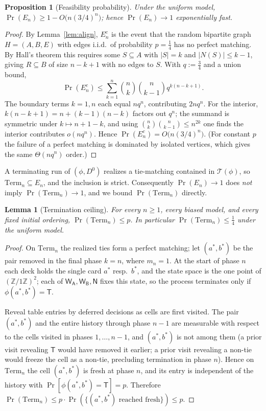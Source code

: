 \documentclass[11pt]{article}
\newtheorem{lemma}{Lemma}
\newtheorem{proposition}{Proposition}
\theoremstyle{definition}
\theoremstyle{remark}
\newcommand{\WA}{\mathsf{W_A}}
\newcommand{\WB}{\mathsf{W_B}}
\newcommand{\TT}{\mathsf{T}}
\newcommand{\NN}{\mathsf{N}}
\newcommand{\Term}{\mathrm{Term}}
\newcommand{\Z}{\mathbb{Z}}
\newcommand{\Tphi}{\mathcal{T}}
\begin{document}
\begin{proposition}[Feasibility probability]\label{prop:feas}
Under the uniform model, $\Pr(E_n) \ge 1 - O\!\bigl(n(3/4)^n\bigr)$; hence $\Pr(E_n) \to 1$ exponentially fast.
\end{proposition}
\begin{proof}
By Lemma~\ref{lem:align}, $E_n^c$ is the event that the random bipartite graph $H = (A, B, E)$ with edges i.i.d.\ of
probability $p = \tfrac14$ has no perfect matching. By Hall's theorem this requires some $S \subseteq A$ with
$|S| = k$ and $|N(S)| \le k - 1$, giving $R \subseteq B$ of size $n - k + 1$ with no edges to $S$. With $q := \tfrac34$
and a union bound,
\[
\Pr(E_n^c) \le \sum_{k=1}^n \binom{n}{k}\binom{n}{k - 1} q^{k(n-k+1)}.
\]
The boundary terms $k = 1, n$ each equal $n q^n$, contributing $2 n q^n$. For the interior, $k(n - k + 1) = n + (k-1)(n-k)$
factors out $q^n$; the summand is symmetric under $k \mapsto n + 1 - k$, and using $\binom{n}{k}\binom{n}{k-1} \le n^{2k}$
one finds the interior contributes $o(n q^n)$. Hence $\Pr(E_n^c) = O\!\bigl(n(3/4)^n\bigr)$. (For constant $p$ the failure
of a perfect matching is dominated by isolated vertices, which gives the same $\Theta(n q^n)$ order.)
\end{proof}

A terminating run of $(\phi, D^0)$ realizes a tie-matching contained in $\Tphi(\phi)$, so $\Term_n \subseteq E_n$, and the
inclusion is strict. Consequently $\Pr(E_n) \to 1$ does \emph{not} imply $\Pr(\Term_n) \to 1$, and we bound
$\Pr(\Term_n)$ directly.

\begin{lemma}[Termination ceiling]\label{lem:ceiling}
For every $n \ge 1$, every biased model, and every fixed initial ordering, $\Pr(\Term_n) \le p$. In particular
$\Pr(\Term_n) \le \tfrac14$ under the uniform model.
\end{lemma}
\begin{proof}
On $\Term_n$ the realized ties form a perfect matching; let $(a^*, b^*)$ be the pair removed in the final phase $k = n$,
where $m_n = 1$. At the start of phase $n$ each deck holds the single card $a^*$ resp.\ $b^*$, and the state space is the
one point of $(\Z/1\Z)^2$; each of $\WA, \WB, \NN$ fixes this state, so the process terminates only if
$\phi(a^*, b^*) = \TT$.

Reveal table entries by deferred decisions as cells are first visited. The pair $(a^*, b^*)$ and the entire history through
phase $n - 1$ are measurable with respect to the cells visited in phases $1, \dots, n - 1$, and $(a^*, b^*)$ is not among
them (a prior visit revealing $\TT$ would have removed it earlier; a prior visit revealing a non-tie would freeze the cell
as a non-tie, precluding termination in phase $n$). Hence on $\Term_n$ the cell $(a^*, b^*)$ is fresh at phase $n$, and its
entry is independent of the history with $\Pr[\phi(a^*, b^*) = \TT] = p$. Therefore
$\Pr(\Term_n) \le p \cdot \Pr(\{(a^*, b^*)\text{ reached fresh}\}) \le p$.
\end{proof}
\end{document}
